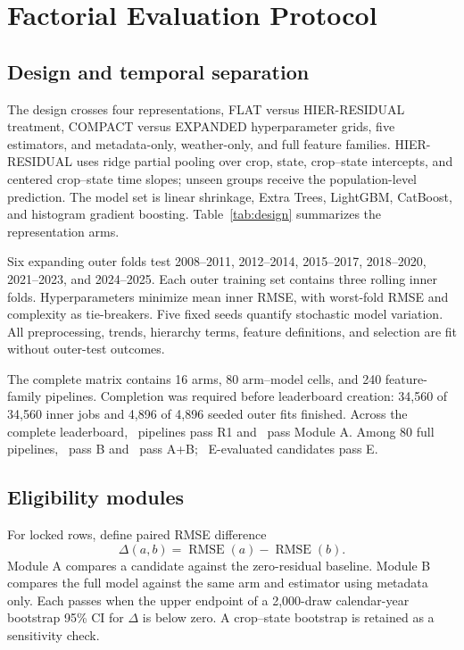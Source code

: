 \documentclass[conference]{IEEEtran}
\begin{document}
\section{Factorial Evaluation Protocol}
\subsection{Design and temporal separation}
The design crosses four representations, FLAT versus HIER-RESIDUAL treatment,
COMPACT versus EXPANDED hyperparameter grids, five estimators, and metadata-only,
weather-only, and full feature families. HIER-RESIDUAL uses ridge partial
pooling over crop, state, crop--state intercepts, and centered crop--state time
slopes; unseen groups receive the population-level prediction. The model set is
linear shrinkage, Extra Trees, LightGBM, CatBoost, and histogram gradient
boosting. Table~\ref{tab:design} summarizes the representation arms.

\begin{table}[!t]
\caption{Weather representation component of the 16-arm design.}
\label{tab:design}
\centering\small
\resizebox{\columnwidth}{!}{}
\end{table}

Six expanding outer folds test 2008--2011, 2012--2014, 2015--2017,
2018--2020, 2021--2023, and 2024--2025. Each outer training set contains three
rolling inner folds. Hyperparameters minimize mean inner RMSE, with worst-fold
RMSE and complexity as tie-breakers. Five fixed seeds quantify stochastic model
variation. All preprocessing, trends, hierarchy terms, feature definitions, and
selection are fit without outer-test outcomes.

The complete matrix contains 16 arms, 80 arm--model cells, and 240
feature-family pipelines. Completion was required before leaderboard creation:
34,560 of 34,560 inner jobs and 4,896 of 4,896 seeded outer fits finished.
Across the complete leaderboard, \ExtPassRone\ pipelines pass R1 and
\ExtPassA\ pass Module A. Among 80 full pipelines, \ExtPassB\ pass B and
\ExtPassAB\ pass A+B; \ExtPassE\ E-evaluated candidates pass E.

\subsection{Eligibility modules}
For locked rows, define paired RMSE difference
\begin{equation}
\Delta(a,b)=\operatorname{RMSE}(a)-\operatorname{RMSE}(b).
\end{equation}
Module A compares a candidate against the zero-residual baseline. Module B
compares the full model against the same arm and estimator using metadata only.
Each passes when the upper endpoint of a 2,000-draw calendar-year bootstrap
95\% CI for $\Delta$ is below zero. A crop--state bootstrap is retained as a
sensitivity check.
\end{document}
